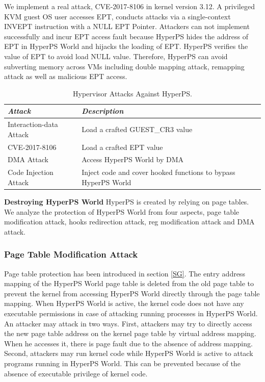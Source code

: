 \documentclass[conference]{IEEEtran}
\begin{document}
We implement a real attack, CVE-2017-8106 in kernel version 3.12. A privileged KVM guest OS user accesses EPT, conducts attacks via a single-context INVEPT instruction with a NULL EPT Pointer. Attackers can not implement successfully and incur EPT access fault because HyperPS hides the address of EPT in HyperPS World and hijacks the loading of EPT. HyperPS verifies the value of EPT to avoid load NULL value. Therefore, HyperPS can avoid subverting memory across VMs including double mapping attack, remapping attack as well as malicious EPT access.


\begin{table}
\centering
\caption{Hypervisor Attacks Against HyperPS.}\label{tab3}
\begin{tabular}{p{2.8cm}|p{5.5cm}}
\hline
{\itshape\bfseries Attack} & {\itshape\bfseries Description} \\
\hline
Interaction-data Attack & Load a crafted GUEST\_CR3 value\\
\hline
CVE-2017-8106 & Load a crafted EPT value \\
\hline
DMA Attack & Access HyperPS World by DMA \\
\hline
Code Injection Attack & Inject code and cover hooked functions to bypass HyperPS World \\
\hline
\end{tabular}
\end{table}

\textbf{Destroying HyperPS World}
HyperPS is created by relying on page tables.
We analyze the protection of HyperPS World from four aspects, page table modification attack, hooks redirection attack, reg modification attack and DMA attack.


\subsubsection{Page Table Modification Attack}

Page table protection has been introduced in section \ref{SG}. The entry address mapping of the HyperPS World page table is deleted from the old page table to prevent the kernel from accessing HyperPS World directly through the page table mapping. When HyperPS World is active, the kernel code does not have any executable permissions in case of attacking running processes in HyperPS World. An attacker may attack in two ways.
First, attackers may try to directly access the new page table address on the kernel page table by virtual address mapping. When he accesses it, there is page fault due to the absence of address mapping.
Second, attackers may run kernel code while HyperPS World is active to attack programs running in HyperPS World. This can be prevented because of the absence of executable privilege of kernel code.
\end{document}
